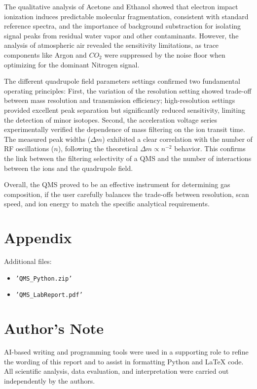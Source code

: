 \documentclass[a4paper]{article}
\begin{document}
The qualitative analysis of Acetone and Ethanol showed that electron impact ionization induces predictable molecular fragmentation, consistent with standard reference spectra, and the importance of background substraction for isolating signal peaks from residual water vapor and other contaminants. However, the analysis of atmospheric air revealed the sensitivity limitations, as trace components like Argon and $CO_2$ were suppressed by the noise floor when optimizing for the dominant Nitrogen signal.

The different quadrupole field parameters settings confirmed two fundamental operating principles: First, the variation of the resolution setting showed trade-off between mass resolution and transmission efficiency; high-resolution settings provided excellent peak separation but significantly reduced sensitivity, limiting the detection of minor isotopes. Second, the acceleration voltage series experimentally verified the dependence of mass filtering on the ion transit time. The measured peak widths ($\Delta m$) exhibited a clear correlation with the number of RF oscillations ($n$), following the theoretical $\Delta m \propto n^{-2}$ behavior. This confirms the link between the filtering selectivity of a QMS and the number of interactions between the ions and the quadrupole field.

Overall, the QMS proved to be an effective instrument for determining gas composition, if the user carefully balances the trade-offs between resolution, scan speed, and ion energy to match the specific analytical requirements.

\newpage
\section{Appendix}

Additional files:

\begin{itemize}
  \item \texttt{'QMS\_Python.zip'}
  \item \texttt{'QMS\_LabReport.pdf'}
\end{itemize}

\printbibliography[heading=bibintoc]

\section*{Author's Note}
AI-based writing and programming tools were used in a supporting role to refine the wording of this report and to assist in formatting Python and LaTeX code.
All scientific analysis, data evaluation, and interpretation were carried out independently by the authors.


\newpage

\end{document}
